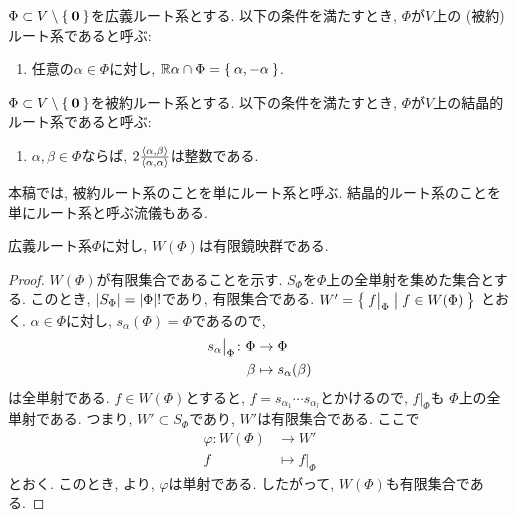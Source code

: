 \begin{definition}
  $\Phi \subset V \setminus \Set{\boldsymbol{0}}$を広義ルート系とする.
  以下の条件を満たすとき, $\Phi$が$V$上の (被約) ルート系であると呼ぶ:
  \begin{enumerate}
  \item 任意の$\alpha \in \Phi$に対し,
    $\mathbb{R}\alpha \cap \Phi = \Set{\alpha,-\alpha}$.
  \end{enumerate}
\end{definition}

\begin{definition}
  $\Phi \subset V \setminus \Set{\boldsymbol{0}}$を被約ルート系とする.
  以下の条件を満たすとき, $\Phi$が$V$上の結晶的ルート系であると呼ぶ:
  \begin{enumerate}
    \item
    $\alpha,\beta\in\Phi$ならば,
      $2\frac{\Braket{\alpha,\beta}}{\Braket{\alpha,\alpha}}$は整数である.
  \end{enumerate}
\end{definition}

\begin{remark}
  本稿では,
  被約ルート系のことを単にルート系と呼ぶ.
  結晶的ルート系のことを単にルート系と呼ぶ流儀もある.
\end{remark}
  
\begin{prop}
広義ルート系$\Phi$に対し,
$W(\Phi)$は有限鏡映群である.
\end{prop}
\begin{proof}
  $W(\Phi)$が有限集合であることを示す.
  $S_\Phi$を$\Phi$上の全単射を集めた集合とする.
  このとき, $\left|S_\Phi\right|=\left|\Phi\right|!$であり,
  有限集合である.
  $W'=\Set{f\bigr|_{\Phi}|f \in W(\Phi)}$
  とおく.
  $\alpha\in\Phi$に対し, $s_\alpha(\Phi)=\Phi$であるので,
  \begin{align*}
    s_\alpha\bigr|_{\Phi}\colon
    \Phi &\to \Phi \\
    \beta&\mapsto s_\alpha(\beta)
  \end{align*}
  は全単射である.
  $f\in W(\Phi)$とすると,
  $f=s_{\alpha_1}\cdots s_{\alpha_l}$とかけるので,
  $f|_\Phi$も
  $\Phi$上の全単射である.
  つまり, $W'\subset S_\Phi$であり, $W'$は有限集合である.
  ここで
  \begin{align*}
     \varphi\colon
     W(\Phi) &\to W' \\
     f&\mapsto f|_{\Phi}
  \end{align*}
  とおく.
  このとき,
  より,
  $\varphi$は単射である.
  したがって, $W(\Phi)$も有限集合である.
\end{proof}

